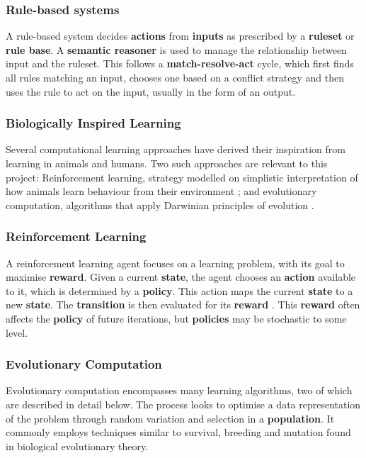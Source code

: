 \subsubsection{Rule-based systems}

A rule-based system decides \textbf{actions} from \textbf{inputs} as prescribed by a \textbf{ruleset} or \textbf{rule base}. A \textbf{semantic reasoner} is used to manage the relationship between input and the ruleset. This follows a \textbf{match-resolve-act} cycle, which first finds all rules matching an input, chooses one based on a conflict strategy and then uses the rule to act on the input, usually in the form of an output. \cite[pp.~28-29]{rbsys}

\subsubsection{Biologically Inspired Learning} 

Several computational learning approaches have derived their inspiration from learning in animals and humans. Two such approaches are relevant to this project: Reinforcement learning, strategy modelled on simplistic interpretation of how animals learn behaviour from their environment \cite[s.~1.2]{suttonrl}; and evolutionary computation, algorithms that apply Darwinian principles of evolution \cite{ev-comp}.


\subsubsection*{Reinforcement Learning}

A reinforcement learning agent focuses on a learning problem, with its goal to maximise \textbf{reward}. Given a current \textbf{state}, the agent chooses an \textbf{action} available to it, which is determined by a \textbf{policy}. This action maps the current \textbf{state} to a new \textbf{state}. The \textbf{transition} is then evaluated for its \textbf{reward} . This \textbf{reward} often affects the \textbf{policy} of future iterations, but \textbf{policies} may be stochastic to some level. \cite[s.~1.3]{suttonrl}

\subsubsection*{Evolutionary Computation}

Evolutionary computation encompasses many learning algorithms, two of which are described in detail below. The process looks to optimise a data representation of the problem through random variation and selection in a \textbf{population}. It commonly employs techniques similar to survival, breeding and mutation found in biological evolutionary theory.  \cite{ev-comp}
	
